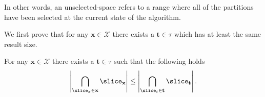  In other words, an unselected-space refers to a range where all of the partitions have been selected at the current state of the algorithm.  


We first prove that for any $\mathbf{x} \in \mathcal{X}$ there exists a $\mathbf{t} \in \tau$ which has at least the same result size.
 
\begin{lemma} 
For any $\mathbf{x} \in \mathcal{X}$ there exists a $\mathbf{t} \in \tau$ such that the following holds
$$
  \left| \bigcap_{\slice_x \in \mathbf{x}}{\mathbf{\slice_x}} \right| \leq \left| \bigcap_{\slice_t \in \mathbf{t}}{\mathbf{\slice_t}} \right|.
$$

\label{lem:FirstSelection}
\end{lemma}

